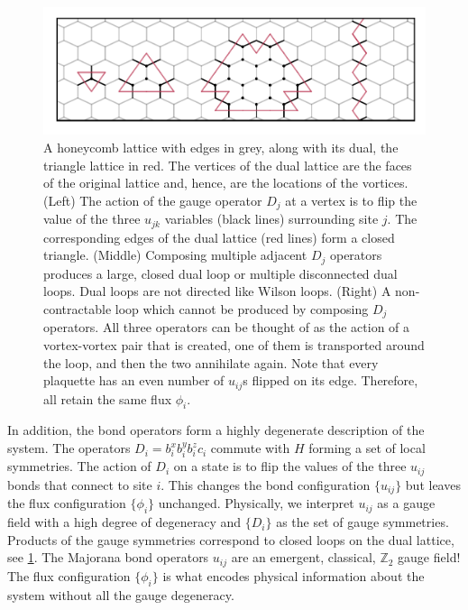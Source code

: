 \hypertarget{fig:gauge_symmetries}{%
\begin{figure}
\centering
\includegraphics[width=1\textwidth,height=\textheight]{figure_code/amk_chapter/intro/gauge_symmetries/gauge_symmetries}
\caption[{Gauge Symmetries}]{A honeycomb lattice with edges in grey, along with its dual, the triangle lattice in red. The vertices of the dual lattice are the faces of the original lattice and, hence, are the locations of the vortices. (Left) The action of the gauge operator \(D_j\) at a vertex is to flip the value of the three \(u_{jk}\) variables (black lines) surrounding site \(j\). The corresponding edges of the dual lattice (red lines) form a closed triangle. (Middle) Composing multiple adjacent \(D_j\) operators produces a large, closed dual loop or multiple disconnected dual loops. Dual loops are not directed like Wilson loops. (Right) A non-contractable loop which cannot be produced by composing \(D_j\) operators. All three operators can be thought of as the action of a vortex-vortex pair that is created, one of them is transported around the loop, and then the two annihilate again. Note that every plaquette has an even number of \(u_{ij}\)s flipped on its edge. Therefore, all retain the same flux \(\phi_i\).}
\label{fig:gauge_symmetries}
\end{figure}
}

In addition, the bond operators form a highly degenerate description of the system. The operators \(D_i = b^x_i b^y_i b^z_i c_i\) commute with \(H\) forming a set of local symmetries. The action of \(D_i\) on a state is to flip the values of the three \(u_{ij}\) bonds that connect to site \(i\). This changes the bond configuration \(\{u_{ij}\}\) but leaves the flux configuration \(\{\phi_i\}\) unchanged. Physically, we interpret \(u_{ij}\) as a gauge field with a high degree of degeneracy and \(\{D_i\}\) as the set of gauge symmetries. Products of the gauge symmetries correspond to closed loops on the dual lattice, see \cref{fig:gauge_symmetries}. The Majorana bond operators \(u_{ij}\) are an emergent, classical, \(\mathbb{Z}_2\) gauge field! The flux configuration \(\{\phi_i\}\) is what encodes physical information about the system without all the gauge degeneracy.

